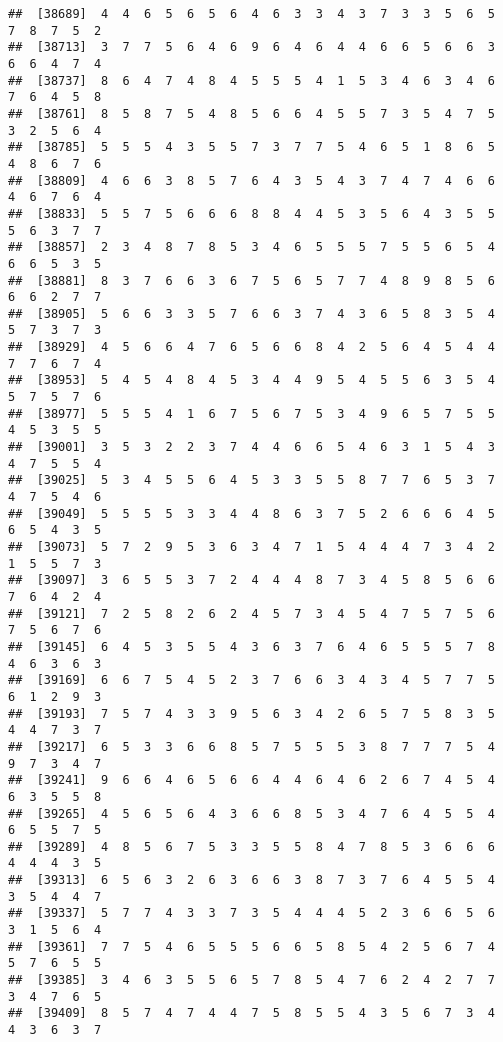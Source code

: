 \documentclass[
]{book}
\begin{document}
\begin{verbatim}
##  [38689]  4  4  6  5  6  5  6  4  6  3  3  4  3  7  3  3  5  6  5  7  8  7  5  2
##  [38713]  3  7  7  5  6  4  6  9  6  4  6  4  4  6  6  5  6  6  3  6  6  4  7  4
##  [38737]  8  6  4  7  4  8  4  5  5  5  4  1  5  3  4  6  3  4  6  7  6  4  5  8
##  [38761]  8  5  8  7  5  4  8  5  6  6  4  5  5  7  3  5  4  7  5  3  2  5  6  4
##  [38785]  5  5  5  4  3  5  5  7  3  7  7  5  4  6  5  1  8  6  5  4  8  6  7  6
##  [38809]  4  6  6  3  8  5  7  6  4  3  5  4  3  7  4  7  4  6  6  4  6  7  6  4
##  [38833]  5  5  7  5  6  6  6  8  8  4  4  5  3  5  6  4  3  5  5  5  6  3  7  7
##  [38857]  2  3  4  8  7  8  5  3  4  6  5  5  5  7  5  5  6  5  4  6  6  5  3  5
##  [38881]  8  3  7  6  6  3  6  7  5  6  5  7  7  4  8  9  8  5  6  6  6  2  7  7
##  [38905]  5  6  6  3  3  5  7  6  6  3  7  4  3  6  5  8  3  5  4  5  7  3  7  3
##  [38929]  4  5  6  6  4  7  6  5  6  6  8  4  2  5  6  4  5  4  4  7  7  6  7  4
##  [38953]  5  4  5  4  8  4  5  3  4  4  9  5  4  5  5  6  3  5  4  5  7  5  7  6
##  [38977]  5  5  5  4  1  6  7  5  6  7  5  3  4  9  6  5  7  5  5  4  5  3  5  5
##  [39001]  3  5  3  2  2  3  7  4  4  6  6  5  4  6  3  1  5  4  3  4  7  5  5  4
##  [39025]  5  3  4  5  5  6  4  5  3  3  5  5  8  7  7  6  5  3  7  4  7  5  4  6
##  [39049]  5  5  5  5  3  3  4  4  8  6  3  7  5  2  6  6  6  4  5  6  5  4  3  5
##  [39073]  5  7  2  9  5  3  6  3  4  7  1  5  4  4  4  7  3  4  2  1  5  5  7  3
##  [39097]  3  6  5  5  3  7  2  4  4  4  8  7  3  4  5  8  5  6  6  7  6  4  2  4
##  [39121]  7  2  5  8  2  6  2  4  5  7  3  4  5  4  7  5  7  5  6  7  5  6  7  6
##  [39145]  6  4  5  3  5  5  4  3  6  3  7  6  4  6  5  5  5  7  8  4  6  3  6  3
##  [39169]  6  6  7  5  4  5  2  3  7  6  6  3  4  3  4  5  7  7  5  6  1  2  9  3
##  [39193]  7  5  7  4  3  3  9  5  6  3  4  2  6  5  7  5  8  3  5  4  4  7  3  7
##  [39217]  6  5  3  3  6  6  8  5  7  5  5  5  3  8  7  7  7  5  4  9  7  3  4  7
##  [39241]  9  6  6  4  6  5  6  6  4  4  6  4  6  2  6  7  4  5  4  6  3  5  5  8
##  [39265]  4  5  6  5  6  4  3  6  6  8  5  3  4  7  6  4  5  5  4  6  5  5  7  5
##  [39289]  4  8  5  6  7  5  3  3  5  5  8  4  7  8  5  3  6  6  6  4  4  4  3  5
##  [39313]  6  5  6  3  2  6  3  6  6  3  8  7  3  7  6  4  5  5  4  3  5  4  4  7
##  [39337]  5  7  7  4  3  3  7  3  5  4  4  4  5  2  3  6  6  5  6  3  1  5  6  4
##  [39361]  7  7  5  4  6  5  5  5  6  6  5  8  5  4  2  5  6  7  4  5  7  6  5  5
##  [39385]  3  4  6  3  5  5  6  5  7  8  5  4  7  6  2  4  2  7  7  3  4  7  6  5
##  [39409]  8  5  7  4  7  4  4  7  5  8  5  5  4  3  5  6  7  3  4  4  3  6  3  7

\end{verbatim}
\end{document}
